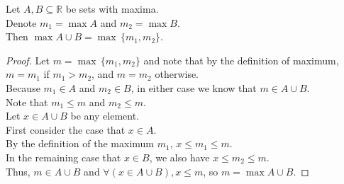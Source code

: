 \documentclass{article}
\newenvironment{theorem}[1]{\renewcommand\theinnercustomthm{#1}\innercustomthm}
  {\endinnercustomthm}
\begin{document}
\newpage{}
\begin{theorem}{4}
Let $A,B \subseteq \mathbb R$ be sets with maxima. \\
Denote $m_1 = \max A$ and $m_2 = \max B$. \\
Then $\max A\cup B = \max\,\{m_1,m_2\}$.
\end{theorem}
\begin{proof}
Let $m=\max \,\{m_1,m_2\}$ and note that by the definition of maximum, $m=m_1$ if $m_1 > m_2$, and $m=m_2$ otherwise. \\
Because $m_1 \in A$ and $m_2 \in B$, in either case we know that $m \in A \cup B$. \\
Note that $m_1 \le m$ and $m_2 \le m$. \\
Let $x\in A \cup B$ be any element. \\
First consider the case that $x \in A$. \\
By the definition of the maximum $m_1$, $x \le m_1 \le m$. \\
In the remaining case that $x \in B$, we also have $x \le m_2 \le m$. \\
Thus, $m \in A \cup B$ and $\forall(x \in A \cup B), x \le m$, so $m = \max A \cup B$.
\end{proof}
\end{document}
